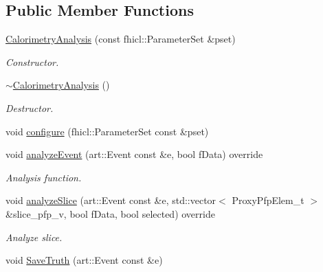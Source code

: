 \subsection*{Public Member Functions}
\begin{DoxyCompactItemize}
\item 
\hyperlink{classanalysis_1_1CalorimetryAnalysis_a9fc9537fa73ab3b36b757832e145ae0d}{Calorimetry\+Analysis} (const fhicl\+::\+Parameter\+Set \&pset)
\begin{DoxyCompactList}\small\item\em Constructor. \end{DoxyCompactList}\item 
\hyperlink{classanalysis_1_1CalorimetryAnalysis_aeb5c760562590aca19660b29a10dab4b}{$\sim$\+Calorimetry\+Analysis} ()\hypertarget{classanalysis_1_1CalorimetryAnalysis_aeb5c760562590aca19660b29a10dab4b}{}\label{classanalysis_1_1CalorimetryAnalysis_aeb5c760562590aca19660b29a10dab4b}

\begin{DoxyCompactList}\small\item\em Destructor. \end{DoxyCompactList}\item 
void \hyperlink{classanalysis_1_1CalorimetryAnalysis_a729ae8d0e6c7634344549e2ac6b5b529}{configure} (fhicl\+::\+Parameter\+Set const \&pset)
\item 
void \hyperlink{classanalysis_1_1CalorimetryAnalysis_ab7bcc6209efde15f2d5459b1a3ea20c7}{analyze\+Event} (art\+::\+Event const \&e, bool f\+Data) override
\begin{DoxyCompactList}\small\item\em Analysis function. \end{DoxyCompactList}\item 
void \hyperlink{classanalysis_1_1CalorimetryAnalysis_acf5806b8aa676a13c5392d775998ead8}{analyze\+Slice} (art\+::\+Event const \&e, std\+::vector$<$ Proxy\+Pfp\+Elem\+\_\+t $>$ \&slice\+\_\+pfp\+\_\+v, bool f\+Data, bool selected) override\hypertarget{classanalysis_1_1CalorimetryAnalysis_acf5806b8aa676a13c5392d775998ead8}{}\label{classanalysis_1_1CalorimetryAnalysis_acf5806b8aa676a13c5392d775998ead8}

\begin{DoxyCompactList}\small\item\em Analyze slice. \end{DoxyCompactList}\item 
void \hyperlink{classanalysis_1_1CalorimetryAnalysis_ab749eab78a84c2c55e0ad4b32ddead9a}{Save\+Truth} (art\+::\+Event const \&e)\hypertarget{classanalysis_1_1CalorimetryAnalysis_ab749eab78a84c2c55e0ad4b32ddead9a}{}\label{classanalysis_1_1CalorimetryAnalysis_ab749eab78a84c2c55e0ad4b32ddead9a}


\end{DoxyCompactItemize}
